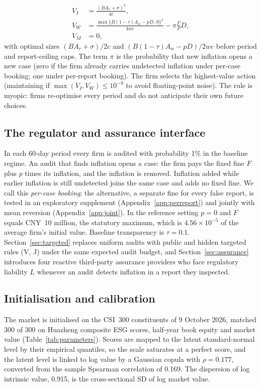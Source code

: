 \documentclass[11pt]{article}
\begin{document}
\begin{align}
V_I &= \frac{(B A_r + \sigma)^2}{4c}, \label{eq:vi}\\
V_W &= \frac{\max\{B(1-\tau)A_w - pD,\, 0\}^2}{4wc} - \pi \frac{F}{P} D, \label{eq:vw}\\
V_M &= 0, \nonumber
\end{align}
with optimal sizes $(BA_r+\sigma)/2c$ and $(B(1-\tau)A_w - pD)/2wc$ before period and report-ceiling caps. The term $\pi$ is the probability that new inflation opens a new case (zero if the firm already carries undetected inflation under per-case booking; one under per-report booking). The firm selects the highest-value action (maintaining if $\max(V_I, V_W) \le 10^{-9}$ to avoid floating-point noise). The rule is myopic: firms re-optimise every period and do not anticipate their own future choices.

\subsection{The regulator and assurance interface}

In each 60-day period every firm is audited with probability 1\% in the baseline regime. An audit that finds inflation opens a case: the firm pays the fixed fine $F$ plus $p$ times its inflation, and the inflation is removed. Inflation added while earlier inflation is still undetected joins the same case and adds no fixed fine. We call this \emph{per-case booking}; the alternative, a separate fine for every false report, is tested in an exploratory supplement (Appendix~\ref{app:perreport}) and jointly with mean reversion (Appendix~\ref{app:joint}). In the reference setting $p = 0$ and $F$ equals CNY~10 million, the statutory maximum, which is $4.56\times10^{-5}$ of the average firm's initial value. Baseline transparency is $\tau = 0.1$. Section~\ref{sec:targeted} replaces uniform audits with public and hidden targeted rules (V, J) under the same expected audit budget, and Section~\ref{sec:assurance} introduces four reactive third-party assurance providers who face regulatory liability $L$ whenever an audit detects inflation in a report they inspected.

\subsection{Initialisation and calibration}

The market is initialised on the CSI~300 constituents of 9 October 2026, matched 300 of 300 on Huazheng composite ESG scores, half-year book equity and market value (Table~\ref{tab:parameters}). Scores are mapped to the latent standard-normal level by their empirical quantiles, so the scale saturates at a perfect score, and the latent level is linked to log value by a Gaussian copula with $\rho = 0.177$, converted from the sample Spearman correlation of 0.169. The dispersion of log intrinsic value, 0.915, is the cross-sectional SD of log market value.
\end{document}
